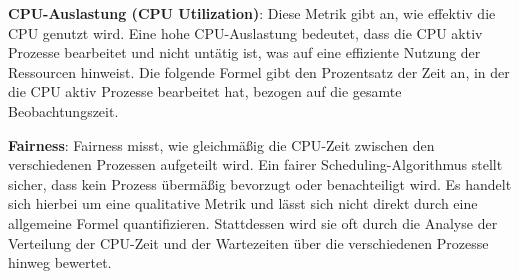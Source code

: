 \textbf{\ac{CPU}-Auslastung (\ac{CPU} Utilization)}: Diese Metrik gibt an, wie effektiv die \ac{CPU} genutzt wird. Eine hohe \ac{CPU}-Auslastung bedeutet, dass die \ac{CPU} aktiv Prozesse bearbeitet und nicht untätig ist, was auf eine effiziente Nutzung der Ressourcen hinweist. Die folgende Formel gibt den Prozentsatz der Zeit an, in der die CPU aktiv Prozesse bearbeitet hat, bezogen auf die gesamte Beobachtungszeit.


\textbf{Fairness}: Fairness misst, wie gleichmäßig die \ac{CPU}-Zeit zwischen den verschiedenen Prozessen aufgeteilt wird. Ein fairer Scheduling-Algorithmus stellt sicher, dass kein Prozess übermäßig bevorzugt oder benachteiligt wird. Es handelt sich hierbei um eine qualitative Metrik und lässt sich nicht direkt durch eine allgemeine Formel quantifizieren. Stattdessen wird sie oft durch die Analyse der Verteilung der \ac{CPU}-Zeit und der Wartezeiten über die verschiedenen Prozesse hinweg bewertet.
